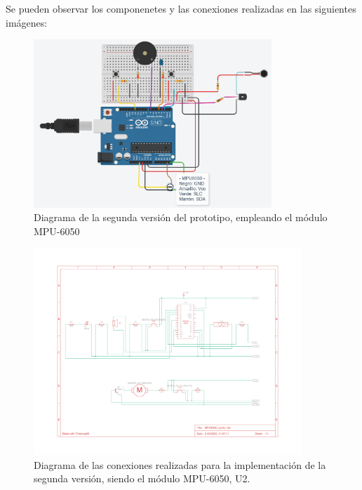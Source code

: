 Se pueden observar los componenetes y las conexiones realizadas en las siguientes imágenes:

\begin{figure}[h!]
    \centering
    \includegraphics[width=0.8\textwidth]{img/PrototipoV2_MPU6050.png}
    \caption{Diagrama de la segunda versión del prototipo, empleando el módulo MPU-6050}
    \label{fig:ProtV1} %
\end{figure}

\begin{figure}[h]
    \centering
    \includegraphics[width=0.9\textwidth]{img/Prot_V2_Esquema.pdf}
    \caption{Diagrama de las conexiones realizadas para la implementación de la segunda versión, siendo el módulo MPU-6050, U2.}
    \label{fig:ProtV1_esquema} %
\end{figure}



